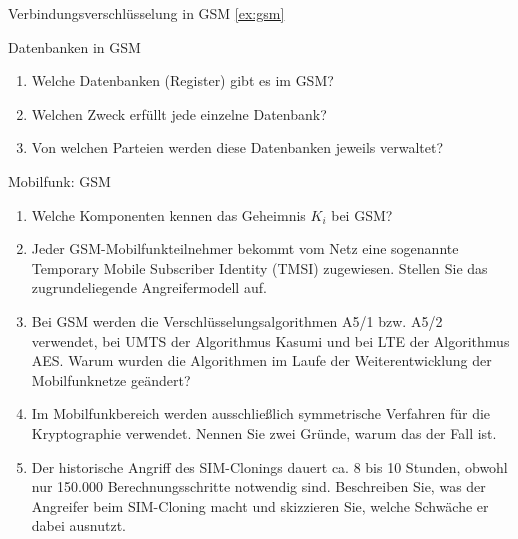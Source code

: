 \documentclass{article}
\begin{document}
\setcounter{subsection}{80}
\begin{exercise}{Verbindungsverschlüsselung in GSM \ref{ex:gsm}}\end{exercise}

\begin{exercise}{Datenbanken in GSM}
  \begin{enumerate}
    \item Welche Datenbanken (Register) gibt es im GSM?
    \item Welchen Zweck erfüllt jede einzelne Datenbank?
    \item Von welchen Parteien werden diese Datenbanken jeweils verwaltet?
  \end{enumerate}

  \begin{solution}
  \end{solution}
\end{exercise}

\begin{exercise}{Mobilfunk: GSM}
  \begin{enumerate}
    \item Welche Komponenten kennen das Geheimnis $K_i$ bei GSM?
    \item Jeder GSM-Mobilfunkteilnehmer bekommt vom Netz eine sogenannte Temporary Mobile Subscriber Identity (TMSI) zugewiesen. Stellen Sie das zugrundeliegende Angreifermodell auf.
    \item Bei GSM werden die Verschlüsselungsalgorithmen A5/1 bzw. A5/2 verwendet, bei UMTS der Algorithmus Kasumi und bei LTE der Algorithmus AES. Warum wurden die Algorithmen im Laufe der Weiterentwicklung der Mobilfunknetze geändert?
    \item Im Mobilfunkbereich werden ausschließlich symmetrische Verfahren für die Kryptographie verwendet. Nennen Sie zwei Gründe, warum das der Fall ist.
    \item Der historische Angriff des SIM-Clonings dauert ca. 8 bis 10 Stunden, obwohl nur 150.000 Berechnungsschritte notwendig sind. Beschreiben Sie, was der Angreifer beim SIM-Cloning macht und skizzieren Sie, welche Schwäche er dabei ausnutzt.
  \end{enumerate}

  \begin{solution}
  \end{solution}
\end{exercise}
\end{document}
